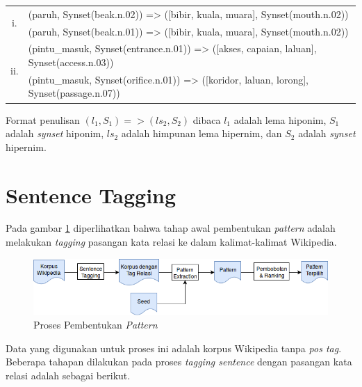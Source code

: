\begin{center}
\begin{tabular}{ |c|m{30em}| } 
  \hline
  \multirow{2}{*}{i.} 
  & (paruh, Synset(beak.n.02)) => ([bibir, kuala, muara], Synset(mouth.n.02)) \\ 
  & (paruh, Synset(beak.n.01)) => ([bibir, kuala, muara], Synset(mouth.n.02)) \\ \hline
\multirow{2}{*}{ii.} 
  & (pintu\_masuk, Synset(entrance.n.01)) => ([akses, capaian, laluan], Synset(access.n.03)) \\ 
  & (pintu\_masuk, Synset(orifice.n.01)) => ([koridor, laluan, lorong], Synset(passage.n.07)) \\ \hline
\end{tabular}
\end{center}

\noindent Format penulisan $(l_1, S_1) => (ls_2, S_2)$ dibaca $l_1$ adalah lema hiponim, $S_1$ adalah \textit{synset} hiponim, $ls_2$ adalah himpunan lema hipernim, dan $S_2$ adalah \textit{synset} hipernim. 
%

%
\section{Sentence Tagging}
Pada gambar \ref{fig:pattern-extraction} diperlihatkan bahwa tahap awal pembentukan \textit{pattern} adalah melakukan \textit{tagging} pasangan kata relasi ke dalam kalimat-kalimat Wikipedia. 

\begin{figure}
    \centering
    \includegraphics[width=\linewidth]{pics/Pic03-PatternExtraction}
    \caption{Proses Pembentukan \textit{Pattern}}
    \label{fig:pattern-extraction}
\end{figure}

\noindent Data yang digunakan untuk proses ini adalah korpus Wikipedia tanpa \textit{pos tag}. Beberapa tahapan dilakukan pada proses \textit{tagging sentence} dengan pasangan kata relasi adalah sebagai berikut.

